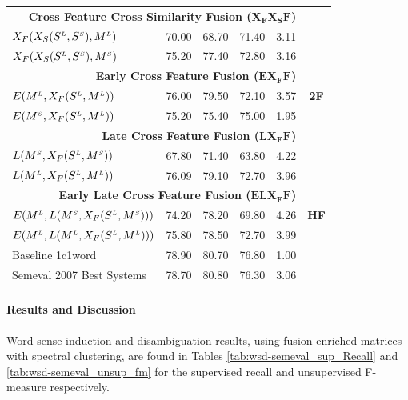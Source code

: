 \begin{table}[htp!]
\begin{tabular}{@{}lrrrrc@{}}
 \midrule
       \multicolumn{5}{r}{\textbf{Cross Feature Cross Similarity Fusion ($\mathbf{X_FX_SF}$)}}   & \multirow{9}{*}{\textbf{2F}}    \\ %

       $X_F(X_S(S^{\scriptscriptstyle L}, S^{\scriptscriptstyle S}), M^{\scriptscriptstyle L})$		&	70.00	&68.70  & 71.40& 3.11 \\	   
       $X_F(X_S(S^{\scriptscriptstyle L}, S^{\scriptscriptstyle S}), M^{\scriptscriptstyle S})$		&	75.20	& 77.40 & 72.80 & 3.16 \\	   
       \multicolumn{5}{r}{\textbf{Early Cross Feature Fusion ($\mathbf{EX_FF}$)}}       \\ %
       
       $E(M^{\scriptscriptstyle L}, X_F(S^{\scriptscriptstyle L}, M^{\scriptscriptstyle L}))$		&	76.00	& 79.50  & 72.10 & 3.57 \\	   
	   $E(M^{\scriptscriptstyle S}, X_F(S^{\scriptscriptstyle L}, M^{\scriptscriptstyle L}))$		&	75.20	&75.40  & 75.00 & 1.95 \\	   
       \multicolumn{5}{r}{\textbf{Late Cross Feature Fusion ($\mathbf{LX_FF}$)}}       \\ %
	   $L(M^{\scriptscriptstyle S}, X_F(S^{\scriptscriptstyle L}, M^{\scriptscriptstyle S}))$		&	67.80	& 71.40&63.80 & 4.22 \\	   
	   $L(M^{\scriptscriptstyle L}, X_F(S^{\scriptscriptstyle L}, M^{\scriptscriptstyle L}))$		&	76.09	&79.10 &72.70 & 3.96 \\	   
       \midrule
       \multicolumn{5}{r}{\textbf{Early Late Cross Feature Fusion ($\mathbf{ELX_FF	}$)}}    & \multirow{3}{*}{\textbf{HF}}   \\ %
	   $E(M^{\scriptscriptstyle L}, L(M^{\scriptscriptstyle S}, X_F(S^{\scriptscriptstyle L}, M^{\scriptscriptstyle S})))$		&	74.20	& 78.20 & 69.80& 4.26 \\	   
	   $E(M^{\scriptscriptstyle L}, L(M^{\scriptscriptstyle L}, X_F(S^{\scriptscriptstyle L}, M^{\scriptscriptstyle L})))$		&	75.80	& 78.50&72.70 & 3.99 \\
	   \midrule
	   \midrule
	   Baseline 1c1word 		&	78.90	& 80.70&76.80 & 1.00 \\ 	   	 	    	   
	   Semeval 2007 Best Systems	&	78.70	& 80.80&76.30 & 3.06 \\ 	 

		   
       \bottomrule
\end{tabular}
\end{table}




\paragraph{Results and Discussion}
Word sense induction and disambiguation results, using fusion enriched matrices with spectral clustering, are found in Tables \ref{tab:wsd-semeval_sup_Recall} and \ref{tab:wsd-semeval_unsup_fm} for the supervised recall and unsupervised F-measure respectively.

